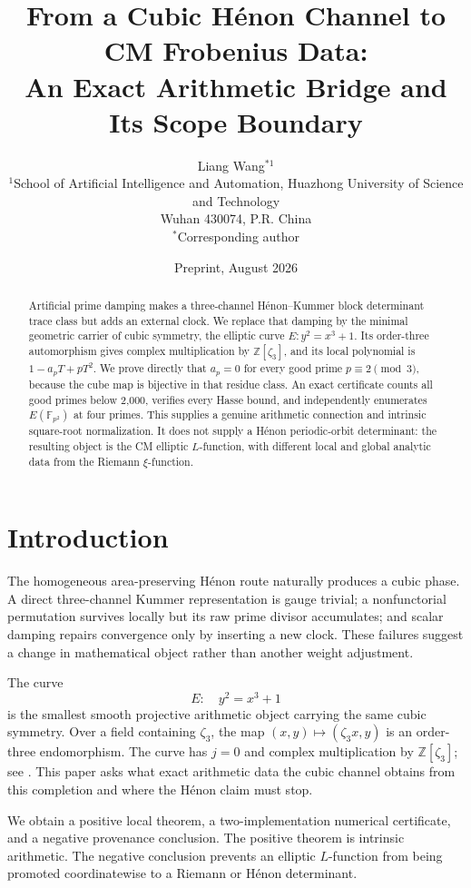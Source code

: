 \documentclass[11pt]{article}
\title{From a Cubic H\'enon Channel to CM Frobenius Data:\\
An Exact Arithmetic Bridge and Its Scope Boundary}
\author{Liang Wang$^{*1}$\\
\small $^{1}$School of Artificial Intelligence and Automation, Huazhong University of Science and Technology\\
\small Wuhan 430074, P.R. China\\
\small $^*$Corresponding author}
\date{Preprint, August 2026}
\theoremstyle{remark}\newtheorem{remark}[theorem]{Remark}
\begin{document}
\maketitle
\begin{abstract}
Artificial prime damping makes a three-channel H\'enon--Kummer block
determinant trace class but adds an external clock.  We replace that damping
by the minimal geometric carrier of cubic symmetry, the elliptic curve
\(E:y^2=x^3+1\).  Its order-three automorphism gives complex multiplication
by \(\mathbb Z[\zeta_3]\), and its local polynomial is
\(1-a_pT+pT^2\).  We prove directly that \(a_p=0\) for every good prime
\(p\equiv2\pmod3\), because the cube map is bijective in that residue class.
An exact certificate counts all good primes below 2,000, verifies every Hasse
bound, and independently enumerates \(E(\mathbb F_{p^2})\) at four primes.
This supplies a genuine arithmetic connection and intrinsic square-root
normalization.  It does not supply a H\'enon periodic-orbit determinant: the
resulting object is the CM elliptic \(L\)-function, with different local and
global analytic data from the Riemann \(\xi\)-function.
\end{abstract}

\section{Introduction}
The homogeneous area-preserving H\'enon route naturally produces a cubic
phase.  A direct three-channel Kummer representation is gauge trivial; a
nonfunctorial permutation survives locally but its raw prime divisor
accumulates; and scalar damping repairs convergence only by inserting a new
clock.  These failures suggest a change in mathematical object rather than
another weight adjustment.

The curve
\begin{equation}\label{eq:E}
 E:\quad y^2=x^3+1
\end{equation}
is the smallest smooth projective arithmetic object carrying the same cubic
symmetry.  Over a field containing \(\zeta_3\), the map
\((x,y)\mapsto(\zeta_3x,y)\) is an order-three endomorphism.  The curve has
\(j=0\) and complex multiplication by \(\mathbb Z[\zeta_3]\); see
\cite{Milne2026,Silverman2009}.  This paper asks what exact arithmetic data
the cubic channel obtains from this completion and where the H\'enon claim
must stop.

We obtain a positive local theorem, a two-implementation numerical
certificate, and a negative provenance conclusion.  The positive theorem is
intrinsic arithmetic.  The negative conclusion prevents an elliptic
\(L\)-function from being promoted coordinatewise to a Riemann or
H\'enon determinant.
\end{document}
